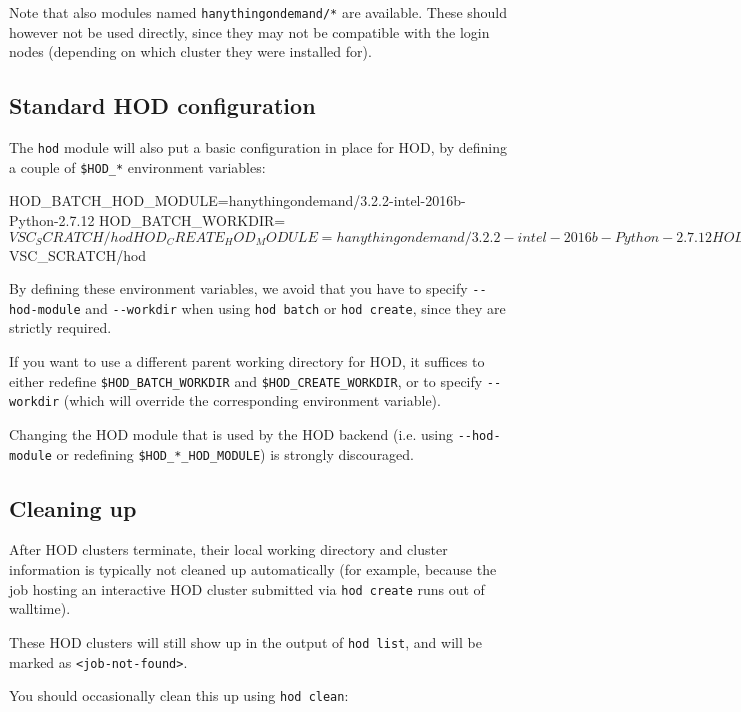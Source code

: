 Note that also modules named \lstinline|hanythingondemand/*| are available. These should
however not be used directly, since they may not be compatible with the login nodes
(depending on which cluster they were installed for).

\subsection{Standard HOD configuration}

The \lstinline|hod| module will also put a basic configuration in place for HOD, by defining a couple of
\lstinline|$HOD_*| environment variables:

\begin{prompt}
HOD_BATCH_HOD_MODULE=hanythingondemand/3.2.2-intel-2016b-Python-2.7.12
HOD_BATCH_WORKDIR=$VSC_SCRATCH/hod
HOD_CREATE_HOD_MODULE=hanythingondemand/3.2.2-intel-2016b-Python-2.7.12
HOD_CREATE_WORKDIR=$VSC_SCRATCH/hod
\end{prompt}

By defining these environment variables, we avoid that you have to specify \lstinline|--hod-module|
and \lstinline|--workdir| when using \lstinline|hod batch| or \lstinline|hod create|, since they are strictly required.

If you want to use a different parent working directory for HOD, it suffices to
either redefine \lstinline|$HOD_BATCH_WORKDIR| and \lstinline|$HOD_CREATE_WORKDIR|,
or to specify \lstinline|--workdir| (which will override the corresponding environment variable).

Changing the HOD module that is used by the HOD backend (i.e. using \lstinline|--hod-module|
or redefining \lstinline|$HOD_*_HOD_MODULE|) is strongly discouraged.

\subsection{Cleaning up}

After HOD clusters terminate, their local working directory and cluster information
is typically not cleaned up automatically (for example, because the job hosting an
interactive HOD cluster submitted via \lstinline|hod create| runs out of walltime).

These HOD clusters will still show up in the output of \lstinline|hod list|, and will be marked as \lstinline|<job-not-found>|.

You should occasionally clean this up using \lstinline|hod clean|:

